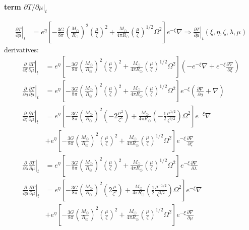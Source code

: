 \documentclass[12pt,a4paper]{article}
\newcommand{\pfird}[2][]{\frac{\partial#1}{\partial#2}}
\newcommand{\lpfird}[2][]{\partial#1/\partial#2}
\begin{document}
\noindent\textbf{term $\lpfird[T]{\mu}|_t$}

\begin{align}
  \left.\pfird[T]{\mu}\right|_t &= e^\eta\left[-\frac{3G}{8\pi}\left(\frac{M_\odot}{R_\odot}\right)^2\left(\frac{\mu}{\zeta}\right)^2 + \frac{M_\odot}{4\pi R_\odot}\left(\frac{\mu}{\zeta}\right)^{1/2} \Omega^2\right]e^{-\xi}\nabla \Rightarrow \left.\pfird[T]{\mu}\right|_t\left(\xi, \eta, \zeta, \lambda, \mu\right)
\end{align}
derivatives:
\begin{align}
  \pfird[]{\xi}\left.\pfird[T]{\mu}\right|_t &= e^\eta\left[-\frac{3G}{8\pi}\left(\frac{M_\odot}{R_\odot}\right)^2\left(\frac{\mu}{\zeta}\right)^2 + \frac{M_\odot}{4\pi R_\odot}\left(\frac{\mu}{\zeta}\right)^{1/2} \Omega^2\right]\left(-e^{-\xi}\nabla + e^{-\xi}\pfird[\nabla]{\xi}\right)\\
  \pfird[]{\eta}\left.\pfird[T]{\mu}\right|_t &= e^\eta\left[-\frac{3G}{8\pi}\left(\frac{M_\odot}{R_\odot}\right)^2\left(\frac{\mu}{\zeta}\right)^2 + \frac{M_\odot}{4\pi R_\odot}\left(\frac{\mu}{\zeta}\right)^{1/2} \Omega^2\right]e^{-\xi}\left(\pfird[\nabla]{\eta} + \nabla\right)\\
  \pfird[]{\zeta}\left.\pfird[T]{\mu}\right|_t &= e^\eta\left[-\frac{3G}{8\pi}\left(\frac{M_\odot}{R_\odot}\right)^2\left(-2\frac{\mu^2}{\zeta^3}\right) + \frac{M_\odot}{4\pi R_\odot}\left(-\frac{1}{2}\frac{\mu^{1/2}}{\zeta^{3/2}}\right) \Omega^2\right]e^{-\xi}\nabla\nonumber \\
  &+ e^\eta\left[-\frac{3G}{8\pi}\left(\frac{M_\odot}{R_\odot}\right)^2\left(\frac{\mu}{\zeta}\right)^2 + \frac{M_\odot}{4\pi R_\odot}\left(\frac{\mu}{\zeta}\right)^{1/2} \Omega^2\right]e^{-\xi}\pfird[\nabla]{\zeta}\\
  \pfird[]{\lambda}\left.\pfird[T]{\mu}\right|_t &= e^\eta\left[-\frac{3G}{8\pi}\left(\frac{M_\odot}{R_\odot}\right)^2\left(\frac{\mu}{\zeta}\right)^2 + \frac{M_\odot}{4\pi R_\odot}\left(\frac{\mu}{\zeta}\right)^{1/2} \Omega^2\right]e^{-\xi}\pfird[\nabla]{\lambda}\\
  \pfird[]{\mu}\left.\pfird[T]{\mu}\right|_t &= e^\eta\left[-\frac{3G}{8\pi}\left(\frac{M_\odot}{R_\odot}\right)^2\left(2\frac{\mu}{\zeta^2}\right) + \frac{M_\odot}{4\pi R_\odot}\left(\frac{1}{2}\frac{\mu^{-1/2}}{\zeta^{3/2}}\right) \Omega^2\right]e^{-\xi}\nabla\nonumber \\
  &+ e^\eta\left[-\frac{3G}{8\pi}\left(\frac{M_\odot}{R_\odot}\right)^2\left(\frac{\mu}{\zeta}\right)^2 + \frac{M_\odot}{4\pi R_\odot}\left(\frac{\mu}{\zeta}\right)^{1/2} \Omega^2\right]e^{-\xi}\pfird[\nabla]{\mu}
\end{align}
\end{document}

